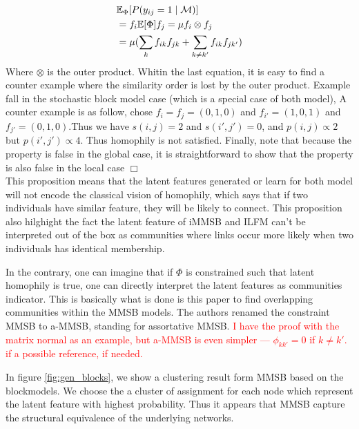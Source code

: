  
%
\begin{align}
&\mathbb{E}_{\Phi}[P(y_{ij}=1 \mid \mathcal{M})] \nonumber \\
&= f_i \mathbb{E}[\Phi]f_j = \mu f_i \otimes f_j  \nonumber \\
&= \mu (\sum_k f_{ik}f_{jk} + \sum_{k\neq k'} f_{ik}f_{jk'} ) \nonumber
\end{align}
%
Where $\otimes$ is the outer product. Whitin the last equation, it is easy to find a counter example where the similarity order is lost by the outer product. Example fall in the stochastic block model case (which is a special case of both model), A counter example is as follow, chose $f_i=f_j=(0,1,0)$ and $f_{i'}=(1,0,1)$ and $f_{j'}=(0,1,0)$.Thus we have $s(i,j)=2$ and $s(i',j')=0$, and $p(i,j) \propto 2$ but $p(i',j') \propto 4$. Thus homophily is not satisfied. Finally, note that because the property is false in the global case, it is straightforward to show that the property is also false in the local case   \hfill $\Box$ \\







This proposition means that the latent features generated or learn for both model will not encode the classical vision of homophily, which says that if two individuals have similar feature, they will be likely to connect. This proposition also hilghight the fact the latent feature of iMMSB and ILFM can't be interpreted out of the box as communities where links occur more likely when two individuals has identical membership.

In the contrary, one can imagine that if $\Phi$ is constrained such that latent homophily is true, one can directly interpret the latent features as communities indicator. This is basically what is done is this paper \cite{AMMSB} to find overlapping communities within the MMSB models. The authors renamed the constraint MMSB to a-MMSB, standing for assortative MMSB. \textcolor{red}{I have the proof with the matrix normal as an example, but a-MMSB is even simpler --- $\phi_{kk'}=0$ if $k\neq k'$. if a possible reference, if needed.}

In figure \ref{fig:gen_blocks}, we show a clustering result form MMSB based on the blockmodels. We choose the a cluster of assignment for each node which represent the latent feature with highest probability. Thus it appears that MMSB capture the structural equivalence of the underlying networks.

